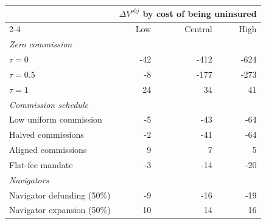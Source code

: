 \begin{tabular}{lrrr}
\hline\hline
 & \multicolumn{3}{c}{$\Delta V^{obj}$ by cost of being uninsured} \\
\cline{2-4}
 & Low & Central & High \\
\hline
\multicolumn{4}{l}{\emph{Zero commission}} \\
\quad $\tau = 0$ & -42 & -412 & -624 \\
\quad $\tau = 0.5$ & -8 & -177 & -273 \\
\quad $\tau = 1$ & 24 & 34 & 41 \\
\multicolumn{4}{l}{\emph{Commission schedule}} \\
\quad Low uniform commission & -5 & -43 & -64 \\
\quad Halved commissions & -2 & -41 & -64 \\
\quad Aligned commissions & 9 & 7 & 5 \\
\quad Flat-fee mandate & -3 & -14 & -20 \\
\multicolumn{4}{l}{\emph{Navigators}} \\
\quad Navigator defunding (50\%) & -9 & -16 & -19 \\
\quad Navigator expansion (50\%) & 10 & 14 & 16 \\
\hline\hline
\end{tabular}
